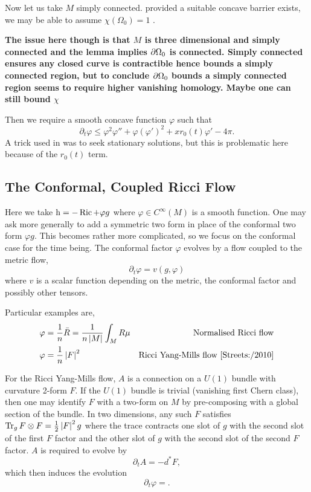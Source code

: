 \documentclass{amsart}
\begin{document}
Now let us take \(M\) simply connected. provided a suitable concave barrier exists, we may be able to assume \(\chi(\Omega_0) = 1\) \cite[Lemma 2.9 and Collaries]{Bryan:/2016}.

\textbf{The issue here though is that \(M\) is three dimensional and simply connected and the lemma implies \(\partial {\Omega_0}\) is connected. Simply connected ensures any closed curve is contractible hence bounds a simply connected region, but to conclude \(\partial {\Omega_0}\) bounds a simply connected region seems to require higher vanishing homology. Maybe one can still bound \(\chi\)}

Then we require a smooth concave function \(\varphi\) such that
\[
\partial_t \varphi \leq \varphi^2\varphi'' + \varphi(\varphi')^2 + x r_0(t) \varphi' - 4\pi.
\]
A trick used in \cite{Bryan:/2016} was to seek stationary solutions, but this is problematic here because of the \(r_0(t)\) term.
\subsection{The Conformal, Coupled Ricci Flow }
\label{subsec:flows_ricci_coupled}

Here we take \(\operatorname{h} = -\operatorname{Ric} + \varphi g\) where \(\varphi \in C^{\infty}(M)\) is a smooth function. One may ask more generally to add a symmetric two form in place of the conformal two form \(\varphi g\). This becomes rather more complicated, so we focus on the conformal case for the time being. The conformal factor \(\varphi\) evolves by a flow coupled to the metric flow,
\[
\partial_t \varphi = v(g, \varphi)
\]
where \(v\) is a scalar function depending on the metric, the conformal factor and possibly other tensors.

Particular examples are,
\begin{align*}
\varphi &= \frac{1}{n} \bar{R} = \frac{1}{n\left|{M}\right|} \int_M R \mu & \text{Normalised Ricci flow} \\
\varphi &= \frac{1}{n} \left|{F}\right|^2 & \text{Ricci Yang-Mills flow \cite{Streets:/2010}}
\end{align*}

For the Ricci Yang-Mills flow, \(A\) is a connection on a \(U(1)\) bundle with curvature 2-form \(F\). If the \(U(1)\) bundle is trivial (vanishing first Chern class), then one may identify \(F\) with a two-form on \(M\) by pre-composing with a global section of the bundle. In two dimensions, any such \(F\) satisfies \(\operatorname{Tr}_g F \otimes F = \tfrac{1}{2} \left|{F}\right|^2 g\) where the trace contracts one slot of \(g\) with the second slot of the first \(F\) factor and the other slot of \(g\) with the second slot of the second \(F\) factor. \(A\) is required to evolve by
\[
\partial_t A = -d^{\ast} F,
\]
which then induces the evolution
\[
\partial_t \varphi = .
\]
\end{document}
